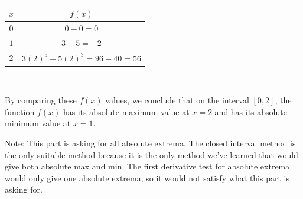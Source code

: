 \documentclass[10pt]{article}
\begin{document}
{\begin{enumerate}
\begin{solution}
    \begin{table}[h!]
        \centering
        \color{blue}
        \begin{tabular}{c|c}
           $x$  & $f(x)$ \\\hline
            $0$ & $0-0=0$\\
            $1$ & $3-5=-2$\\
            $2$ & $3(2)^5-5(2)^3=96-40=56$\\
        \end{tabular}\
    \end{table}
    By comparing these $f(x)$ values, we conclude that on the interval $[0, 2]$, the function $f(x)$ has its absolute maximum value at $x=2$ and has its absolute minimum value at $x=1$.
    

    {\color{orange} Note: This part is asking for all absolute extrema. The closed interval method is the only suitable method because it is the only method we've learned that would give both absolute max and min. The first derivative test for absolute extrema would only give one absolute extrema, so it would not satisfy what this part is asking for.}
\end{solution}
\end{enumerate}

}

\newpage
\end{document}
